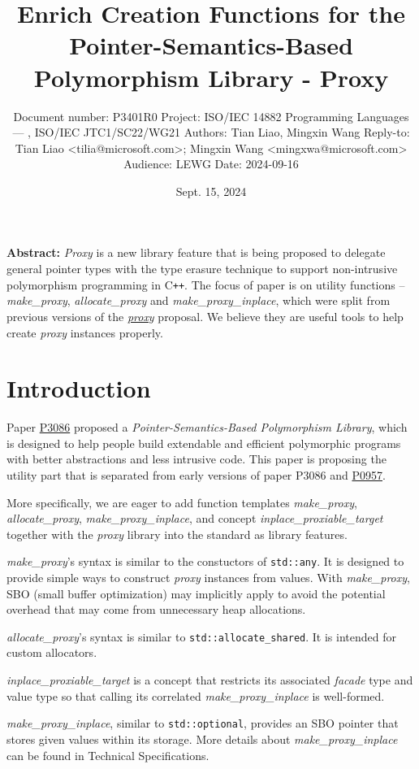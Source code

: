 \documentclass[10pt, a4paper, oneside]{article}
\title{Enrich Creation Functions for the Pointer-Semantics-Based
Polymorphism Library - Proxy}
\date{Sept. 15, 2024}
\author{%
\medbreak
Document number: P3401R0\smallbreak
Project: ISO/IEC 14882 Programming Languages — \Cpp{}, ISO/IEC JTC1/SC22/WG21\smallbreak
Authors: Tian Liao, Mingxin Wang\smallbreak
Reply-to: Tian Liao \textless tilia@microsoft.com\textgreater; Mingxin Wang \textless mingxwa@microsoft.com\textgreater \smallbreak
Audience: LEWG\smallbreak
Date: 2024-09-16
}
\makeatletter
\newcommand{\Cpp}{C\texttt{++}}
\renewcommand{\maketitle}{\bgroup\setlength{\parindent}{0pt}
\begin{flushleft}
  \textbf{\huge \@title}

  \@author
\end{flushleft}\egroup
}
\makeatother
\begin{document}
\maketitle

\textbf{Abstract:} \textit{Proxy} is a new library feature that is being proposed to delegate general pointer types
with the type erasure technique to support non-intrusive polymorphism programming in \Cpp.
The focus of paper is on utility functions -- \textit{make\_proxy}, \textit{allocate\_proxy} and \textit{make\_proxy\_inplace},
which were split from previous versions of the \href{https://wg21.link/p3086r1}{\textit{proxy}} proposal.
We believe they are useful tools to help create \textit{proxy} instances properly.

\section{Introduction}

Paper \href{https://wg21.link/p3086}{P3086} proposed a \textit{Pointer-Semantics-Based Polymorphism Library},
which is designed to help people build extendable and efficient polymorphic programs with better abstractions and less intrusive code.
This paper is proposing the utility part that is separated from early versions of paper P3086 and \href{https://wg21.link/p0957}{P0957}.

More specifically, we are eager to add function templates \textit{make\_proxy}, \textit{allocate\_proxy}, \textit{make\_proxy\_inplace},
and concept \textit{inplace\_proxiable\_target} together with the \textit{proxy} library into the standard as library features.

\textit{make\_proxy}'s syntax is similar to the constuctors of \verb|std::any|.
It is designed to provide simple ways to construct \textit{proxy} instances from values.
With \textit{make\_proxy}, SBO (small buffer optimization) may implicitly apply to avoid the potential overhead that may come from unnecessary heap allocations.

\textit{allocate\_proxy}'s syntax is similar to \verb|std::allocate_shared|. It is intended for custom allocators.

\textit{inplace\_proxiable\_target} is a concept that restricts its associated \textit{facade} type and value type
so that calling its correlated \textit{make\_proxy\_inplace} is well-formed.

\textit{make\_proxy\_inplace}, similar to \verb|std::optional|,
provides an SBO pointer that stores given values within its storage.
More details about \textit{make\_proxy\_inplace} can be found in Technical Specifications.
\end{document}
